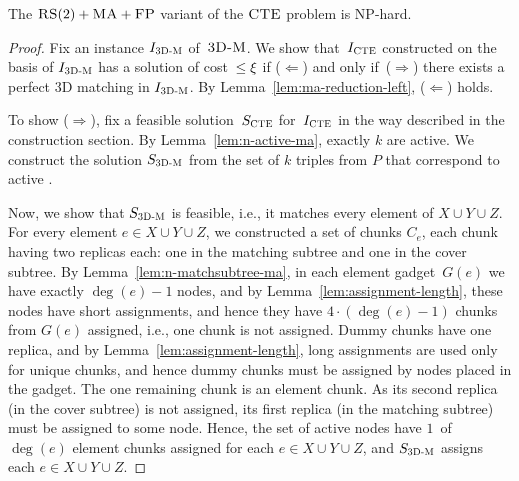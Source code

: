 \begin{theorem}
  The $\textsc{RS}(2)+\textsc{MA}+\textsc{FP}$ variant of the $\textsc{CTE}$ problem is NP-hard.
  \label{th:ma-reduction}
\end{theorem}

\begin{proof}
  
  Fix an instance $I_{\mathrm{\textsc{3D-M}}}$ of~$\textsc{3D-M}$.
  We show that~$I_{\mathrm{\textsc{CTE}}}$ constructed on the basis of $I_{\mathrm{\textsc{3D-M}}}$ has a solution of cost~$\leq \xi$ if ($\Leftarrow$) and only if~($\Rightarrow$) there exists a perfect 3D matching in $I_{\mathrm{\textsc{3D-M}}}$.
  By Lemma~\ref{lem:ma-reduction-left}, ($\Leftarrow$) holds.

  To show ($\Rightarrow$), fix a feasible solution~$S_{\mathrm{\textsc{CTE}}}$ for~$I_{\mathrm{\textsc{CTE}}}$ in the way described in the construction section.
  By Lemma~\ref{lem:n-active-ma}, exactly $k$ \TripleGadgets{} are active.
  We construct the solution $S_{\mathrm{\textsc{3D-M}}}$ from the set of $k$ triples from $P$ that correspond to active \TripleGadgets{}.

  Now, we show that $S_{\mathrm{\textsc{3D-M}}}$ is feasible, i.e., it matches every element of $X\cup Y\cup Z$.
  For every element $e\in X\cup Y \cup Z$, we constructed a set of chunks $C_e$, each chunk having two replicas each: one in the matching subtree and one in the cover subtree.
  By Lemma~\ref{lem:n-matchsubtree-ma}, in each element gadget~$G(e)$ we have exactly $\deg(e) - 1$ nodes, and by Lemma~\ref{lem:assignment-length}, these nodes have short assignments, and hence they have $4 \cdot (\deg(e) - 1)$ chunks from $G(e)$ assigned, i.e., one chunk is not assigned.
  Dummy chunks have one replica, and by Lemma~\ref{lem:assignment-length}, long assignments are used only for unique chunks, and hence dummy chunks must be assigned by nodes placed in the gadget.
  The one remaining chunk is an element chunk.
  As its second replica (in the cover subtree) is not assigned, its first replica (in the matching subtree) must be assigned to some node.
  Hence, the set of active nodes have $1$~of $\deg(e)$ element chunks assigned for each $e\in X\cup Y\cup Z$, and $S_{\mathrm{\textsc{3D-M}}}$ assigns each $e\in X\cup Y\cup Z$.
 

\end{proof}
